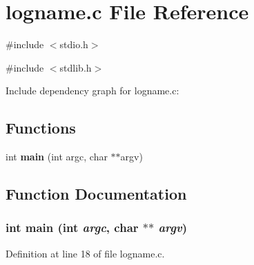 \section{logname.c File Reference}
\label{logname_8c}
{\ttfamily \#include $<$stdio.h$>$}\par
{\ttfamily \#include $<$stdlib.h$>$}\par
Include dependency graph for logname.c:\subsection*{Functions}
\begin{DoxyCompactItemize}
\item 
int {\bf main} (int argc, char $\ast$$\ast$argv)
\end{DoxyCompactItemize}


\subsection{Function Documentation}
\subsubsection[{main}]{\setlength{\rightskip}{0pt plus 5cm}int main (int {\em argc}, \/  char $\ast$$\ast$ {\em argv})}\label{logname_8c_a3c04138a5bfe5d72780bb7e82a18e627}


Definition at line 18 of file logname.c.

